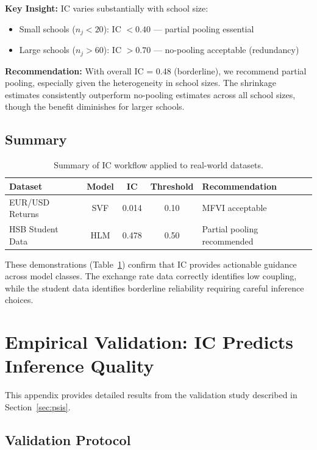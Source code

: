 \documentclass[10pt]{article} %
\theoremstyle{plain}
\theoremstyle{definition}
\begin{document}
\textbf{Key Insight:} IC varies substantially with school size:
\begin{itemize}
    \item Small schools ($n_j < 20$): IC $< 0.40$ --- partial pooling essential
    \item Large schools ($n_j > 60$): IC $> 0.70$ --- no-pooling acceptable (redundancy)
\end{itemize}

\textbf{Recommendation:} With overall IC = 0.48 (borderline), we recommend partial pooling, especially given the heterogeneity in school sizes. The shrinkage estimates consistently outperform no-pooling estimates across all school sizes, though the benefit diminishes for larger schools.

\subsection{Summary}

\begin{table}[!htbp]
\centering
\begin{tabular}{lcccl}
\toprule
Dataset & Model & IC & Threshold & Recommendation \\
\midrule
EUR/USD Returns & SVF & 0.014 & 0.10 & MFVI acceptable \\
HSB Student Data & HLM & 0.478 & 0.50 & Partial pooling recommended \\
\bottomrule
\end{tabular}
\caption{Summary of IC workflow applied to real-world datasets.}
\label{tab:realworld}
\end{table}

These demonstrations (Table~\ref{tab:realworld}) confirm that IC provides actionable guidance across model classes. The exchange rate data correctly identifies low coupling, while the student data identifies borderline reliability requiring careful inference choices.
\section{Empirical Validation: IC Predicts Inference Quality}
\label{app:psis}

This appendix provides detailed results from the validation study described in Section~\ref{sec:psis}.

\subsection{Validation Protocol}
\end{document}

